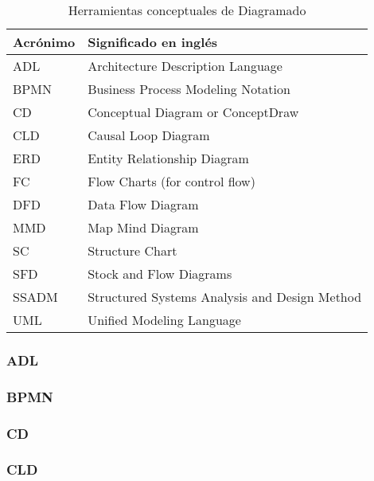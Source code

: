\begin{table}[h]
\centering
\caption{Herramientas conceptuales de Diagramado}
\label{Herramientas-conceptuales-de-Diagramado}
\begin{tabular}{|l|l|}
\hline
Acrónimo & Significado en inglés                         \\ \hline
ADL      & Architecture Description Language             \\ \hline
BPMN     & Business Process Modeling Notation            \\ \hline
CD       & Conceptual Diagram or ConceptDraw             \\ \hline
CLD      & Causal Loop Diagram                           \\ \hline
ERD      & Entity Relationship Diagram                   \\ \hline
FC       & Flow Charts (for control flow)                \\ \hline
DFD      & Data Flow Diagram                             \\ \hline
MMD      & Map Mind Diagram                              \\ \hline
SC       & Structure Chart                               \\ \hline
SFD      & Stock and Flow Diagrams                       \\ \hline
SSADM    & Structured Systems Analysis and Design Method \\ \hline
UML      & Unified Modeling Language                     \\ \hline
\end{tabular}
\end{table}

\subsubsection{ADL}

\subsubsection{BPMN}

\subsubsection{CD}

\subsubsection{CLD}

